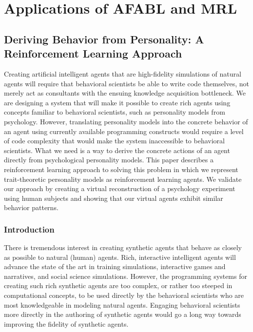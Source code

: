 

\chapter{Applications of AFABL and MRL}

\section{Deriving Behavior from Personality: A Reinforcement Learning Approach}

Creating artificial intelligent agents that are high-fidelity simulations of natural agents will require that behavioral scientists be able to write code themselves, not merely act as consultants with the ensuing knowledge acquisition bottleneck.  We are designing a system that will make it possible to create rich agents using concepts familiar to behavioral scientists, such as personality models from psychology.  However, translating personality models into the concrete behavior of an agent using currently available programming constructs would require a level of code complexity that would make the system inaccessible to behavioral scientists.  What we need is a way to derive the concrete actions of an agent directly from psychological personality models.  This paper describes a reinforcement learning approach to solving this problem in which we represent trait-theoretic personality models as reinforcement learning agents.  We validate our approach by creating a virtual reconstruction of a psychology experiment using human subjects and showing that our virtual agents exhibit similar behavior patterns.


\subsection{Introduction}

There is tremendous interest in creating synthetic agents that behave as closely as possible to natural (human) agents.  Rich, interactive intelligent agents will advance the state of the art in training simulations, interactive games and narratives, and social science simulations.  However, the programming systems for creating such rich synthetic agents are too complex, or rather too steeped in computational concepts, to be used directly by the behavioral scientists who are most knowledgeable in modeling natural agents. Engaging behavioral scientists more directly in the authoring of synthetic agents would go a long way towards improving the fidelity of synthetic agents.

